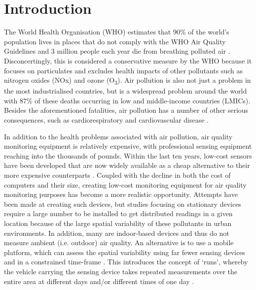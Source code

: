 \documentclass[11pt]{report}
\begin{document}
\chapter{Introduction}

The World Health Organisation (WHO) estimates that 90\% of the world's population lives in places that do not comply with the WHO Air Quality Guidelines and 3 million people each year die from breathing polluted air \citep{WHO2016ambient}. Disconcertingly, this is considered a conservative measure by the WHO because it focuses on particulates and excludes health impacts of other pollutants such as nitrogen oxides (NOx) and ozone (O\textsubscript{3}). Air pollution is also not just a problem in the most industrialised countries, but is a widespread problem around the world with 87\% of these deaths occurring in low and middle-income countries (LMICs). Besides the aforementioned fatalities, air pollution has a number of other serious consequences, such as cardiorespiratory and cardiovascular disease \citep{pope1995particulate,dockery1993_6cityairpoll,pope2002lungcancercardiomortality}.


In addition to the health problems associated with air pollution, air quality monitoring equipment is relatively expensive, with professional sensing equipment reaching into the thousands of pounds. Within the last ten years, low-cost sensors have been developed that are now widely available as a cheap alternative to their more expensive counterparts \citep{Clements2017lowcostworkshop}. Coupled with the decline in both the cost of computers and their size, creating low-cost monitoring equipment for air quality monitoring purposes has become a more realistic opportunity. Attempts have been made at creating such devices, but studies focusing on stationary devices require a large number to be installed to get distributed readings in a given location because of the large spatial variability of these pollutants in urban environments. In addition, many are indoor-based devices and thus do not measure ambient (i.e. outdoor) air quality. An alternative is to use a mobile platform, which can assess the spatial variability using far fewer sensing devices and in a constrained time-frame \citep{Hagler2010durhamallelectric,Wallace2009mobilehamilton,Westerdahl2005losangeles,Weijers2004movingmeasurementunit,Adams2012hamilton20052010,Elen2013aeroflex}. This introduces the concept of `runs', whereby the vehicle carrying the sensing device takes repeated measurements over the entire area at different days and/or different times of one day \citep{Peters2013cycleruns}.
\end{document}

